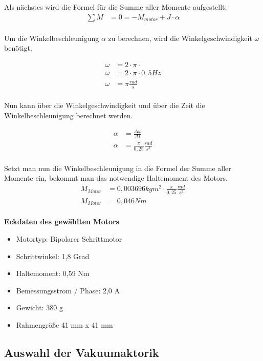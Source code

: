 Als nächstes wird die Formel für die Summe aller Momente aufgestellt:
\begin{align*}
    \sum M &= 0 = -M_{motor}+ J\cdot \alpha\\
\end{align*}

Um die Winkelbeschleunigung $\alpha$ zu berechnen, wird die Winkelgeschwindigkeit $\omega$ benötigt.

\begin{align*}
    \omega &= 2 \cdot \pi \cdot\\
    \omega &= 2 \cdot \pi \cdot 0,5 Hz\\
    \omega &= \pi \tfrac{rad}{s}\\
\end{align*}

Nun kann über die Winkelgeschwindigkeit und über die Zeit die Winkelbeschleunigung berechnet werden.

\begin{align*}
    \alpha &= \frac{\Delta \omega }{\Delta t}\\
    \alpha &= \frac{\pi }{0,25} \tfrac{rad}{s^{2}}\\
\end{align*}

Setzt man nun die Winkelbeschleunigung in die Formel der Summe aller Momente ein, bekommt man das notwendige
Haltemoment des Motors.
\begin{align*}
    M_{Motor} &= 0,003696kgm^{2} \cdot \frac{\pi }{0,25}\tfrac{rad}{s^{2}}\\
    M_{Motor} &= 0,046Nm\\
\end{align*}




\textbf{Eckdaten des gewählten Motors}
\begin{itemize}
    \item Motortyp: Bipolarer Schrittmotor
    \item Schrittwinkel: 1,8 Grad
    \item Haltemoment: 0,59 Nm
    \item Bemessungsstrom / Phase: 2,0 A
    \item Gewicht: 380 g
    \item Rahmengröße 41 mm x 41 mm
\end{itemize}
\subsection{Auswahl der Vakuumaktorik}
